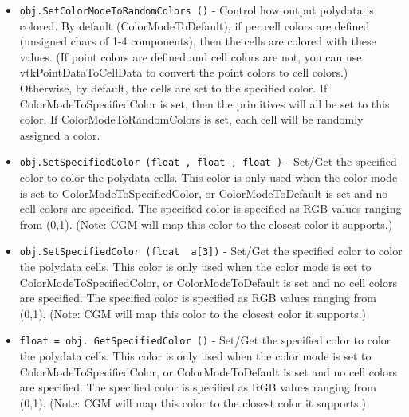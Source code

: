 \begin{itemize}
\item  \verb|obj.SetColorModeToRandomColors ()| -  Control how output polydata is colored. By default (ColorModeToDefault),
 if per cell colors are defined (unsigned chars of 1-4 components), then
 the cells are colored with these values. (If point colors are defined
 and cell colors are not, you can use vtkPointDataToCellData to convert
 the point colors to cell colors.) Otherwise, by default, the cells are
 set to the specified color. If ColorModeToSpecifiedColor is set, then
 the primitives will all be set to this color. If ColorModeToRandomColors
 is set, each cell will be randomly assigned a color.

\item  \verb|obj.SetSpecifiedColor (float , float , float )| -  Set/Get the specified color to color the polydata cells. This
 color is only used when the color mode is set to 
 ColorModeToSpecifiedColor, or ColorModeToDefault is set and no
 cell colors are specified. The specified color is specified as RGB 
 values ranging from (0,1). (Note: CGM will map this color to the
 closest color it supports.)

\item  \verb|obj.SetSpecifiedColor (float  a[3])| -  Set/Get the specified color to color the polydata cells. This
 color is only used when the color mode is set to 
 ColorModeToSpecifiedColor, or ColorModeToDefault is set and no
 cell colors are specified. The specified color is specified as RGB 
 values ranging from (0,1). (Note: CGM will map this color to the
 closest color it supports.)

\item  \verb|float = obj. GetSpecifiedColor ()| -  Set/Get the specified color to color the polydata cells. This
 color is only used when the color mode is set to 
 ColorModeToSpecifiedColor, or ColorModeToDefault is set and no
 cell colors are specified. The specified color is specified as RGB 
 values ranging from (0,1). (Note: CGM will map this color to the
 closest color it supports.)

\end{itemize}
